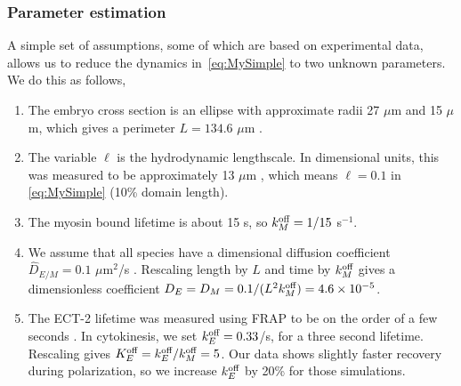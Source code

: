 \documentclass[11pt]{article}
\begin{document}
\begin{appendix}
\subsubsection{Parameter estimation}
A simple set of assumptions, some of which are based on experimental data, allows us to reduce the dynamics in\ \eqref{eq:MySimple} to two unknown parameters. We do this as follows, 
\begin{enumerate}
\item The embryo cross section is an ellipse with approximate radii 27 $\mu$m and 15 $\mu$m, which gives a perimeter $L=134.6$ $\mu$m \citep{goehring2011polarization} .
\item The variable $\ell$ is the hydrodynamic lengthscale. In dimensional units, this was measured to be approximately 13 $\mu$m \citep{mayer2010anisotropies}, which means $\ell = 0.1$ in \eqref{eq:MySimple} (10\% domain length).  
\item The myosin bound lifetime is about 15 s, so $k^\text{off}_M=1/15$ s$^{-1}$.
\item We assume that all species have a dimensional diffusion coefficient $\hat D_{E/M}=0.1$ $\mu$m$^2$/s \citep{goehring2011polarization, gross2019guiding, robin2014single}. Rescaling length by $L$ and time by $k^\text{off}_M$ gives a dimensionless coefficient $D_E=D_M=0.1/(L^2 k^\text{off}_M)=4.6 \times 10^{-5}$. 
\item The ECT-2 lifetime was measured using FRAP to be on the order of a few seconds \citep[Fig.~3D]{longhini2022aurora}. In cytokinesis, we set $k^\text{off}_E=0.33$/s, for a three second lifetime. Rescaling gives $K^\text{off}_E=k^\text{off}_E/k^\text{off}_M=5$. Our data shows slightly faster recovery during polarization, so we increase $k^\text{off}_E$ by 20\% for those simulations.

\end{enumerate}
\end{appendix}
\end{document}
